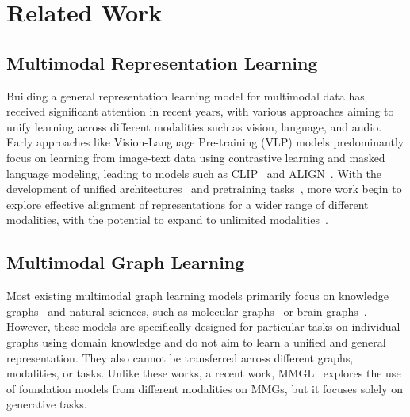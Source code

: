 \section{Related Work}
\subsection{Multimodal Representation Learning}
Building a general representation learning model for multimodal data has received significant attention in recent years, with various approaches aiming to unify learning across different modalities such as vision, language, and audio. 
Early approaches like Vision-Language Pre-training (VLP) models predominantly focus on learning from image-text data using contrastive learning and masked language modeling, leading to models such as CLIP~\cite{radford2021learning} and ALIGN~\cite{jia2021scaling}.
With the development of unified architectures~\cite{vaswani2017attention,dosovitskiy2020image,jaegleperceiver} and pretraining tasks~\cite{he2022masked,baobeit,kenton2019bert,radford2018improving}, more work begin to explore effective alignment of representations for a wider range of different modalities, with the potential to expand to unlimited modalities~\cite{girdhar2023imagebind,wang2023one}.

\subsection{Multimodal Graph Learning}
Most existing multimodal graph learning models primarily focus on knowledge graphs~\cite{chen2022hybrid,zeng2023multi} and natural sciences, such as molecular graphs~\cite{jinlearning} or brain graphs~\cite{wang2023hypergraph}.
However, these models are specifically designed for particular tasks on individual graphs using domain knowledge and do not aim to learn a unified and general representation. They also cannot be transferred across different graphs, modalities, or tasks. 
Unlike these works, a recent work, MMGL~\cite{yoon2023multimodal} explores the use of foundation models from different modalities on MMGs, but it focuses solely on generative tasks.


